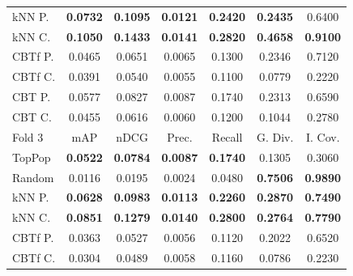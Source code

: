 \begin{table}[hbt]
\begin{tabulary}{\textwidth}{|L|CCCCCC|}
kNN P. & \textbf{0.0732} &  \textbf{0.1095} &  \textbf{0.0121} &  \textbf{0.2420} &                                   \textbf{0.2435} &                                            0.6400 \\
kNN C. & \textbf{0.1050} &  \textbf{0.1433} &  \textbf{0.0141} &  \textbf{0.2820} &                                   \textbf{0.4658} &                                   \textbf{0.9100} \\
CBTf P. & 0.0465 &           0.0651 &           0.0065 &           0.1300 &                                            0.2346 &                                            0.7120 \\
CBTf C. & 0.0391 &           0.0540 &           0.0055 &           0.1100 &                                            0.0779 &                                            0.2220 \\
CBT P. & 0.0577 &           0.0827 &           0.0087 &           0.1740 &                                            0.2313 &                                            0.6590 \\
CBT C. & 0.0455 &           0.0616 &           0.0060 &           0.1200 &                                            0.1044 &                                            0.2780 \\
\hline
\hline
Fold 3 & mAP & nDCG & Prec. & Recall & G. Div. & I. Cov. \\
\hline
TopPop & \textbf{0.0522} &  \textbf{0.0784} &  \textbf{0.0087} &  \textbf{0.1740} &                                            0.1305 &                                            0.3060 \\
Random & 0.0116 &           0.0195 &           0.0024 &           0.0480 &                                   \textbf{0.7506} &                                   \textbf{0.9890} \\
kNN P. & \textbf{0.0628} &  \textbf{0.0983} &  \textbf{0.0113} &  \textbf{0.2260} &                                   \textbf{0.2870} &                                   \textbf{0.7490} \\
kNN C. & \textbf{0.0851} &  \textbf{0.1279} &  \textbf{0.0140} &  \textbf{0.2800} &                                   \textbf{0.2764} &                                   \textbf{0.7790} \\
CBTf P. & 0.0363 &           0.0527 &           0.0056 &           0.1120 &                                            0.2022 &                                            0.6520 \\
CBTf C. & 0.0304 &           0.0489 &           0.0058 &           0.1160 &                                            0.0786 &                                            0.2230 \\

\end{tabulary}
\end{table}
